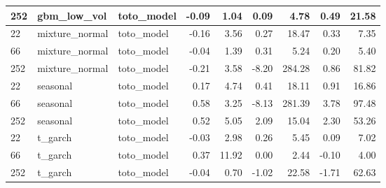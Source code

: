 {\begin{tabular}{lllrrrrrr}
252 & gbm\_low\_vol & toto\_model & -0.09 & 1.04 & 0.09 & 4.78 & 0.49 & 21.58 \\
\midrule
22 & mixture\_normal & toto\_model & -0.16 & 3.56 & 0.27 & 18.47 & 0.33 & 7.35 \\
66 & mixture\_normal & toto\_model & -0.04 & 1.39 & 0.31 & 5.24 & 0.20 & 5.40 \\
252 & mixture\_normal & toto\_model & -0.21 & 3.58 & -8.20 & 284.28 & 0.86 & 81.82 \\
\midrule
22 & seasonal & toto\_model & 0.17 & 4.74 & 0.41 & 18.11 & 0.91 & 16.86 \\
66 & seasonal & toto\_model & 0.58 & 3.25 & -8.13 & 281.39 & 3.78 & 97.48 \\
252 & seasonal & toto\_model & 0.52 & 5.05 & 2.09 & 15.04 & 2.30 & 53.26 \\
\midrule
22 & t\_garch & toto\_model & -0.03 & 2.98 & 0.26 & 5.45 & 0.09 & 7.02 \\
66 & t\_garch & toto\_model & 0.37 & 11.92 & 0.00 & 2.44 & -0.10 & 4.00 \\
252 & t\_garch & toto\_model & -0.04 & 0.70 & -1.02 & 22.58 & -1.71 & 62.63 \\
\bottomrule
\end{tabular}
}